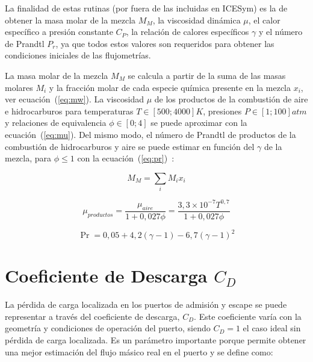 La finalidad de estas rutinas (por fuera de las incluidas en ICESym) es la de
obtener la masa molar de la mezcla $M_{M}$, la viscosidad dinámica $\mu$, el
calor específico a presión constante $C_{P}$, la relación de calores
específicos $\gamma$ y el número de Prandtl $P_{r}$, ya que todos estos valores
son requeridos para obtener las condiciones iniciales de las flujometrías.

La masa molar de la mezcla $M_{M}$ se calcula a partir de la suma de las masas
molares $M_{i}$ y la fracción molar de cada especie química presente en la
mezcla $x_{i}$, ver ecuación~(\ref{eq:mw}).
%
La viscosidad $\mu$ de los productos de la combustión de aire e hidrocarburos
para temperaturas $T\in [500; 4000]K$, presiones $P\in[1; 100]atm$ y relaciones
de equivalencia $\phi \in [0;4]$ se puede aproximar con la
ecuación~(\ref{eq:mu}).
%
Del mismo modo, el número de Prandtl de productos de la combustión de
hidrocarburos y aire se puede estimar en función del $\gamma$ de la mezcla,
para $\phi\leq 1$ con la ecuación~(\ref{eq:pr})~\parencite{heywood}:


\begin{equation}\label{eq:mw}
  M_{M} = \sum_{i} M_{i}x_{i}
\end{equation}

\begin{equation}\label{eq:mu}
  \mu_{productos} = \frac{\mu_{aire}} {1 + 0,027 \phi} = \frac{3,3\times 10^{-7} T^{0,7}} {1 + 0,027 \phi}
\end{equation}

\begin{equation}\label{eq:pr}
    \Pr = 0,05 + 4,2 (\gamma - 1) - 6,7 {(\gamma - 1)}^{2}
\end{equation}


\section{Coeficiente de Descarga $C_{D}$}\label{sec:cap2_cd}
%
La pérdida de carga localizada en los puertos de admisión y escape se puede
representar a través del coeficiente de descarga, $C_{D}$.
%
Este coeficiente varía con la geometría y condiciones de operación del puerto,
siendo $C_{D}=1$ el caso ideal sin pérdida de carga localizada.
%
Es un parámetro importante porque permite obtener una mejor estimación del flujo
másico real en el puerto y se define como:

